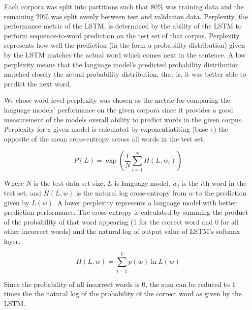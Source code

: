 \documentclass{article}
\begin{document}

Each corpora was split into partitions such that $80\%$ was training data
and the remaining $20\%$ was split evenly between test and validation
data. Perplexity, the performance metric of the LSTM, is determined by the
ability of the LSTM to perform sequence-to-word prediction on the test
set of that corpus. Perplexity represents how well the prediction (in the
form a probability distribution) given by the LSTM matches the actual
word which comes next in the sentence. A low perplexity means that the
language model's predicted probability distribution matched closely the
actual probability distribution, that is, it was better able to predict
the next word.


We chose word-level perplexity was chosen as the metric for comparing the
language models' performance on the given corpora since it provides
a good measurement of the models overall ability to predict words
in the given corpus. Perplexity for a given model is calculated
by exponentiatiting (base $e$) the opposite of the mean
cross-entropy across all words in the test set.

\begin{equation}
\label{perplexity}
    P(L) = \exp\left(\frac{1}{N}\sum^{N}_{i=1} H(L,w_i)\right)
\end{equation}

Where $N$ is the test data set size, $L$ is language model, $w_i$
is the $i$th word in the test set, and $H(L, w)$ is the natural log
cross-entropy from $w$ to the prediction given by $L(w)$. A lower perplexity represents a language model with better prediction
performance. The cross-entropy is calculated by summing the 
product of the probability of that word appearing ($1$ for the
correct word and $0$ for all other incorrect words) and the
natural log of output value of LSTM's softmax layer.

\begin{equation}
\label{cross-entropy}
    H(L,w) = \sum_{i=1}^V p(w) \ln L(w)
\end{equation}

Since the probability of all incorrect words is $0$, the sum
can be reduced to $1$ times the the natural log of the probability
of the correct word as given by the LSTM.
\end{document}
